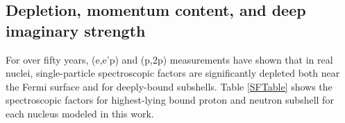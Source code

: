 \subsection{Depletion, momentum content, and deep imaginary strength}
For over fifty years, (e,e'p) and (p,2p) measurements have shown that in real
nuclei, single-particle spectroscopic factors are significantly depleted both
near the Fermi surface and for deeply-bound subshells. Table \ref{SFTable} shows
the spectroscopic factors for highest-lying bound proton and neutron subshell
for each nucleus modeled in this work.
\begin{table}[H]
    \centering
    {
    }
    \caption[Valence Spectroscopic Factors extracted from DOM analysis]
    {
        Spectroscopic factors for protons and neutrons in the valence
        subshell (e.g., $\pi$\pOne, $\nu$\dFive for \oEight) are listed for
        all nuclei considered in the present treatment.
    }
    \label{NeutronSkinsTable}
\end{table}


